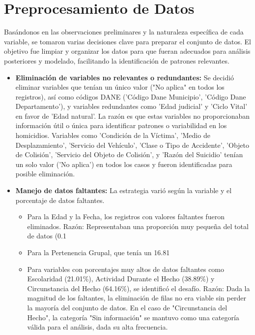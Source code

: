 \documentclass[lettersize,journal]{IEEEtran}
\begin{document}
\section{Preprocesamiento de Datos}
Basándonos en las observaciones preliminares y la naturaleza específica de cada variable, se tomaron varias decisiones clave para preparar el conjunto de datos. El objetivo fue limpiar y organizar los datos para que fueran adecuados para análisis posteriores y modelado, facilitando la identificación de patrones relevantes.
\begin{itemize}
    \item \textbf{Eliminación de variables no relevantes o redundantes:} Se decidió eliminar variables que tenían un único valor ("No aplica" en todos los registros), así como códigos DANE ('Código Dane Municipio', 'Código Dane Departamento'), y variables redundantes como 'Edad judicial' y 'Ciclo Vital' en favor de 'Edad natural'. La razón es que estas variables no proporcionaban información útil o única para identificar patrones o variabilidad en los homicidios. Variables como 'Condición de la Víctima', 'Medio de Desplazamiento', 'Servicio del Vehículo', 'Clase o Tipo de Accidente', 'Objeto de Colisión', 'Servicio del Objeto de Colisión', y 'Razón del Suicidio' tenían un solo valor ('No aplica') en todos los casos y fueron identificadas para posible eliminación.
    \item \textbf{Manejo de datos faltantes:} La estrategia varió según la variable y el porcentaje de datos faltantes.
    \begin{itemize}
        \item Para la Edad y la Fecha, los registros con valores faltantes fueron eliminados. Razón: Representaban una proporción muy pequeña del total de datos (0.1%
        \item Para la Pertenencia Grupal, que tenía un 16.81%
        \item Para variables con porcentajes muy altos de datos faltantes como Escolaridad (21.01\%), Actividad Durante el Hecho (38.89\%) y Circunstancia del Hecho (64.16\%), se identificó el desafío. Razón: Dada la magnitud de los faltantes, la eliminación de filas no era viable sin perder la mayoría del conjunto de datos. En el caso de "Circunstancia del Hecho", la categoría "Sin información" se mantuvo como una categoría válida para el análisis, dada su alta frecuencia.

\end{itemize}
\end{itemize}
\end{document}
